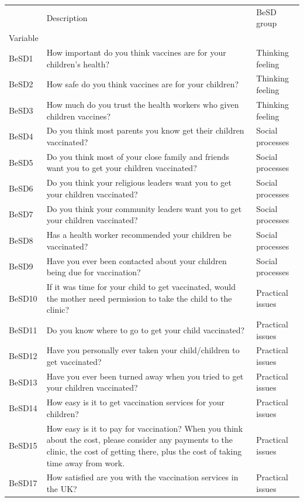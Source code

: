 \begin{tabular}{lll}
\toprule
 & Description & BeSD group \\
Variable &  &  \\
\midrule
BeSD1 & How important do you think vaccines are for your children’s health? & Thinking feeling \\
BeSD2 & How safe do you think vaccines are for your children? & Thinking feeling \\
BeSD3 & How much do you trust the health workers who given children vaccines? & Thinking feeling \\
BeSD4 & Do you think most parents you know get their children vaccinated? & Social processes \\
BeSD5 & Do you think most of your close family and friends want you to get your children vaccinated? & Social processes \\
BeSD6 &  Do you think your religious leaders want you to get your children vaccinated? & Social processes \\
BeSD7 & Do you think your community leaders want you to get your children vaccinated? & Social processes \\
BeSD8 & Has a health worker recommended your children be vaccinated? & Social processes \\
BeSD9 & Have you ever been contacted about your children being due for vaccination? & Social processes \\
BeSD10 & If it was time for your child to get vaccinated, would the mother need permission to take the child to the clinic? & Practical issues \\
BeSD11 & Do you know where to go to get your child vaccinated? & Practical issues \\
BeSD12 & Have you personally ever taken your child/children to get vaccinated? & Practical issues \\
BeSD13 & Have you ever been turned away when you tried to get your children vaccinated? & Practical issues \\
BeSD14 & How easy is it to get vaccination services for your children? & Practical issues \\
BeSD15 & How easy is it to pay for vaccination? When you think about the cost, please consider any payments to the clinic, the cost of getting there, plus the cost of taking time away from work. & Practical issues \\
BeSD17 & How satisfied are you with the vaccination services in the UK? & Practical issues \\
\bottomrule
\end{tabular}
